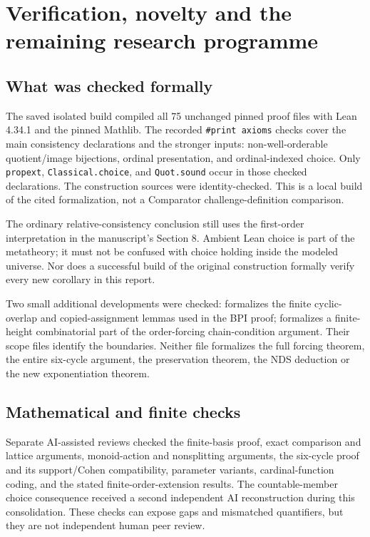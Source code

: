 \section{Verification, novelty and the remaining research programme}
\label{sec:verification}
\subsection{What was checked formally}
The saved isolated build compiled all 75 unchanged pinned  proof files with Lean 4.34.1 and the pinned Mathlib. The recorded \texttt{\#print axioms} checks cover the main consistency declarations and the stronger inputs: non-well-orderable quotient/image bijections, ordinal presentation, and ordinal-indexed choice. Only \texttt{propext}, \texttt{Classical.choice}, and \texttt{Quot.sound} occur in those checked declarations. The construction sources were identity-checked. This is a local build of the cited formalization, not a Comparator challenge-definition comparison.

The ordinary relative-consistency conclusion still uses the first-order interpretation in the manuscript's Section 8. Ambient Lean choice is part of the metatheory; it must not be confused with choice holding inside the modeled universe. Nor does a successful build of the original construction formally verify every new corollary in this report.

Two small additional developments were checked:  formalizes the finite cyclic-overlap and copied-assignment lemmas used in the BPI proof;  formalizes a finite-height combinatorial part of the order-forcing chain-condition argument. Their scope files identify the boundaries. Neither file formalizes the full forcing theorem, the entire six-cycle argument, the preservation theorem, the NDS deduction or the new exponentiation theorem.

\subsection{Mathematical and finite checks}
Separate AI-assisted reviews checked the finite-basis proof, exact comparison and lattice arguments, monoid-action and nonsplitting arguments, the six-cycle proof and its support/Cohen compatibility, parameter variants, cardinal-function coding, and the stated finite-order-extension results. The countable-member choice consequence received a second independent AI reconstruction during this consolidation. These checks can expose gaps and mismatched quantifiers, but they are not independent human peer review.

